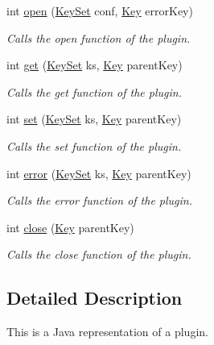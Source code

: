 \begin{DoxyCompactItemize}
\item 
int \hyperlink{interfaceorg_1_1libelektra_1_1Plugin_a740f0602ea62e7a28c86fc801add8907}{open} (\hyperlink{classorg_1_1libelektra_1_1KeySet}{Key\+Set} conf, \hyperlink{classorg_1_1libelektra_1_1Key}{Key} error\+Key)
\begin{DoxyCompactList}\small\item\em Calls the open function of the plugin. \end{DoxyCompactList}\item 
int \hyperlink{interfaceorg_1_1libelektra_1_1Plugin_a9b8362549b7ab8ca5eff39cf6b7c8046}{get} (\hyperlink{classorg_1_1libelektra_1_1KeySet}{Key\+Set} ks, \hyperlink{classorg_1_1libelektra_1_1Key}{Key} parent\+Key)
\begin{DoxyCompactList}\small\item\em Calls the get function of the plugin. \end{DoxyCompactList}\item 
int \hyperlink{interfaceorg_1_1libelektra_1_1Plugin_a650ce789086f5becf21c5f91fad4c42e}{set} (\hyperlink{classorg_1_1libelektra_1_1KeySet}{Key\+Set} ks, \hyperlink{classorg_1_1libelektra_1_1Key}{Key} parent\+Key)
\begin{DoxyCompactList}\small\item\em Calls the set function of the plugin. \end{DoxyCompactList}\item 
int \hyperlink{interfaceorg_1_1libelektra_1_1Plugin_aa91370570c862ebe9eb83094a4731b9a}{error} (\hyperlink{classorg_1_1libelektra_1_1KeySet}{Key\+Set} ks, \hyperlink{classorg_1_1libelektra_1_1Key}{Key} parent\+Key)
\begin{DoxyCompactList}\small\item\em Calls the error function of the plugin. \end{DoxyCompactList}\item 
int \hyperlink{interfaceorg_1_1libelektra_1_1Plugin_aa5d4abf6ffd0d477d6972b13bed05d41}{close} (\hyperlink{classorg_1_1libelektra_1_1Key}{Key} parent\+Key)
\begin{DoxyCompactList}\small\item\em Calls the close function of the plugin. \end{DoxyCompactList}\end{DoxyCompactItemize}


\subsection{Detailed Description}
This is a Java representation of a plugin. 

